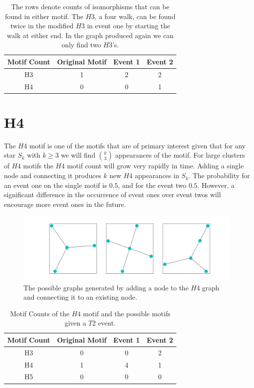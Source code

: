 \begin{table}[h!]
    \centering
        \begin{tabular}{||c c c c||} 
            \hline
            Motif Count & Original Motif & Event 1 & Event 2\\ [0.5ex] 
            \hline\hline
            H3 & 1 & 2 & 2\\ 
            \hline
            H4 & 0 & 0 & 1\\
            \hline
        \end{tabular}
        \caption{The rows denote counts of isomorphisms that can be found in either 
        motif. The $H3$, a four walk, can be found twice in the modified $H3$ in event one
        by starting the walk at either end. In the graph produced again we can only find
        two $H3$'s.}
        \label{table:1}
\end{table}

\section{H4}
The $H4$ motif is one of the motifs that are of primary interest given that for any star $S_k$
with $k \geq 3$ we will find ${k \choose 3}$ appearances of the motif. For large
clusters of $H4$ motifs the $H4$ motif count will grow very rapidly in time. Adding a single node and connecting it produces $k$ new $H4$ appearances in $S_k$. The probability
for an event one on the single motif is $0.5$, and for the event two $0.5$. However, a significant
difference in the occurrence of event ones over event twos will encourage more event ones in the future. 

\begin{figure}[!ht]
    \includegraphics[width=14cm]{Images/H4_evolution.png}
    \centering
    \caption{The possible graphs generated by adding a node to the $H4$ graph 
    and connecting it to an existing node.}
    \label{fig:H4T2}
\end{figure}

\begin{table}[h!]
    \centering
    \begin{tabular}{||c c c c||} 
    \hline
    Motif Count & Original Motif & Event 1 & Event 2\\ [0.5ex] 
    \hline\hline
    H3 & 0 & 0 & 2\\ 
    \hline
    H4 & 1 & 4 & 1\\
    \hline
    H5 & 0 & 0 & 0\\
    \hline
   \end{tabular}
   \caption{Motif Counts of the $H4$ motif and the possible 
   motifs given a $T2$ event.}
    \label{table:2}
\end{table}


